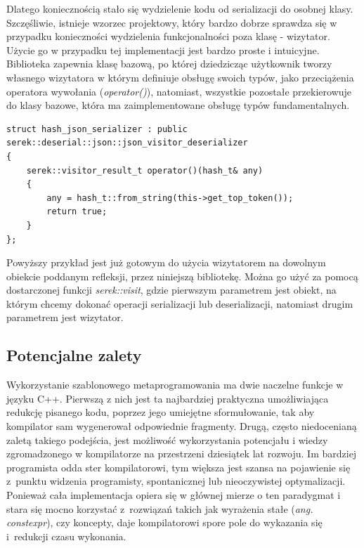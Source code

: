 \documentclass[12pt]{article}
\newcommand{\n}{\newline}
\begin{document}
{{{				Dlatego koniecznością stało się wydzielenie kodu od serializacji do osobnej klasy. Szczęśliwie, istnieje wzorzec projektowy,
				który bardzo dobrze sprawdza się w przypadku konieczności wydzielenia funkcjonalności poza klasę - wizytator\cite{visitor_description}.
				Użycie go w przypadku tej implementacji jest bardzo proste i intuicyjne. Biblioteka zapewnia klasę bazową, po której dziedzicząc
				użytkownik tworzy własnego wizytatora w którym definiuje obsługę swoich typów, jako przeciążenia operatora wywołania ({\it operator()}),
				natomiast, wszystkie pozostałe przekierowuje do klasy bazowe, która ma zaimplementowane obsługę typów fundamentalnych.\n

				\begin{lstlisting}[frame=single]
struct hash_json_serializer : public serek::deserial::json::json_visitor_deserializer
{
	serek::visitor_result_t operator()(hash_t& any)
	{
		any = hash_t::from_string(this->get_top_token());
		return true;
	}
};
				\end{lstlisting}

				Powyższy przykład jest już gotowym do użycia wizytatorem na dowolnym obiekcie poddanym refleksji, przez niniejszą
				bibliotekę. Można go użyć za pomocą dostarczonej funkcji {\it serek::visit}, gdzie pierwszym parametrem jest obiekt, na którym
				chcemy dokonać operacji serializacji lub deserializacji, natomiast drugim parametrem jest wizytator.
			}
		}

		{
			\subsection{Potencjalne zalety}

			Wykorzystanie szablonowego metaprogramowania\cite{wiki_meta} ma dwie naczelne funkcje w języku C++. Pierwszą z nich jest
			ta najbardziej praktyczna umożliwiająca redukcję pisanego kodu, poprzez jego umiejętne sformułowanie, tak aby kompilator
			sam wygenerował odpowiednie fragmenty. Drugą, często niedocenianą zaletą takiego podejścia, jest możliwość wykorzystania
			potencjału i wiedzy zgromadzonego w kompilatorze na przestrzeni dziesiątek lat rozwoju. Im bardziej programista odda ster
			kompilatorowi, tym większa jest szansa na pojawienie się z~punktu widzenia programisty, spontanicznej lub nieoczywistej
			optymalizacji. Ponieważ cała implementacja opiera się w głównej mierze o ten paradygmat i stara się mocno korzystać
			z~rozwiązań takich jak wyrażenia stałe ({\it ang. constexpr}), czy koncepty, daje kompilatorowi spore pole do wykazania się
			i~redukcji czasu wykonania.
		}
	}
\end{document}
